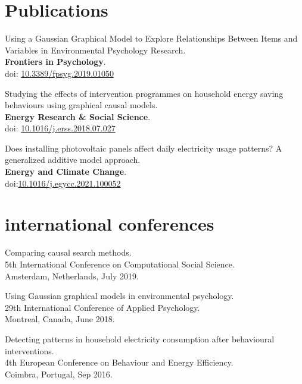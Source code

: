 \begin{minipage}[t]{0.675\textwidth}
\section{Publications} 
\sectionspace %
\vspace{\topsep} %
\begin{tightitemize}
\item Using a Gaussian Graphical Model to Explore Relationships Between Items and Variables in Environmental Psychology Research.\\ \textbf{Frontiers in Psychology}. \\doi: \href{https://dx.doi.org/10.3389/fpsyg.2019.01050}{10.3389/fpsyg.2019.01050}
\item Studying the effects of intervention programmes on household energy saving behaviours using graphical causal models.\\ \textbf{Energy Research \& Social Science}.\\doi: \href{https://doi.org/10.1016/j.erss.2018.07.027}{10.1016/j.erss.2018.07.027}
\item Does installing photovoltaic panels affect daily electricity usage patterns? A generalized additive model approach. \\ \textbf{Energy and Climate Change}. \\doi:\href{https://doi.org/10.1016/j.egycc.2021.100052}{10.1016/j.egycc.2021.100052}
\end{tightitemize}
\sectionspace %

\section{international conferences} 
\vspace{\topsep} %
\begin{tightitemize}
\item Comparing causal search methods.\\ 5th International Conference on Computational Social Science.\\ Amsterdam, Netherlands, July 2019.
\item Using Gaussian graphical models in environmental psychology.\\ 29th International Conference of Applied Psychology.\\ Montreal, Canada, June 2018.
\item Detecting patterns in household electricity consumption after behavioural interventions.\\ 4th European Conference on Behaviour and Energy Efficiency.\\ Coimbra, Portugal, Sep 2016.
\end{tightitemize}

\sectionspace %


\end{minipage} %
\vspace*{\fill}
\center{\textcolor{gray}{2/2}}